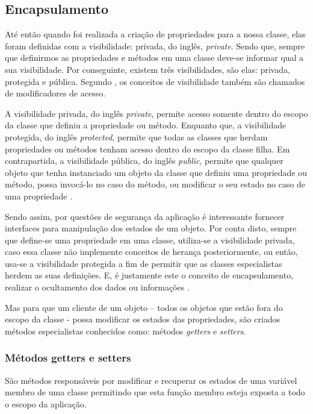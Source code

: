 \subsection{Encapsulamento}

Até então quando foi realizada a criação de propriedades para a nossa
classe, elas foram definidas com a visibilidade: privada, do inglês,
\textit{private}. Sendo que, sempre que definirmos as propriedades e métodos em
uma classe deve-se informar qual a  sua visibilidade. Por conseguinte, existem
três visibilidades, são elas: privada, protegida e pública. Segundo
, os conceitos de visibilidade também são
chamados de modificadores de acesso.

A visibilidade privada, do inglês \textit{private}, permite acesso somente
dentro do escopo da classe que definiu a propriedade ou método. Enquanto que, a
visibilidade protegida, do inglês \textit{protected}, permite que todas as
classes  que herdam propriedades ou métodos tenham acesso dentro do escopo da classe filha.
Em contrapartida, a visibilidade pública, do inglês \textit{public}, permite que
qualquer objeto que tenha instanciado um objeto da classe que definiu uma propriedade ou
método, possa invocá-lo no caso do método, ou modificar o seu estado no caso de
uma propriedade \cite{learningJava}.

Sendo assim, por questões de segurança da aplicação é interessante fornecer
interfaces para manipulação dos estados de um objeto. Por conta disto,  sempre
que define-se uma propriedade em uma classe, utiliza-se a visibilidade
privada, caso essa classe não implemente conceitos de herança posteriormente,
ou então, usa-se a visibilidade protegida a fim de permitir que as classes
especialistas  herdem as suas definições. E, é justamente este o conceito de
encapsulamento, realizar o ocultamento dos dados ou informações \cite{javaComoProgramar}.

Mas para que um cliente de um objeto – todos os objetos que estão fora do
escopo da classe - possa modificar os estados das propriedades, são criados
métodos especialistas conhecidos como: métodos \textit{getters} e \textit{setters}.

\subsubsection{Métodos getters e setters}

São métodos responsáveis por modificar e recuperar os estados de uma variável
membro de uma classe permitindo que esta função membro esteja exposta a todo o
escopo da aplicação.

